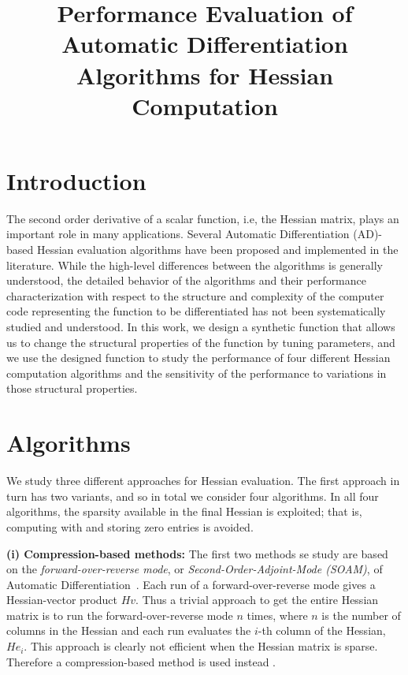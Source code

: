 \documentclass[11pt, twocolumn]{article}
\begin{document}
\title{Performance Evaluation of Automatic Differentiation Algorithms for Hessian Computation}
\maketitle

\section*{Introduction}
The second order derivative of a scalar function, i.e, the Hessian matrix, plays 
an important role in many applications. 
Several Automatic Differentiation (AD)-based Hessian evaluation algorithms have been proposed and implemented in the literature. While the high-level differences between the algorithms is generally understood, the detailed behavior of the algorithms and their performance characterization with respect to the structure and complexity of the computer code  representing the function to be differentiated has not been systematically studied and understood. In this work, we design a synthetic function that allows us to change the structural properties of the function by tuning parameters, and we use the designed function to study the performance of four different Hessian computation algorithms and the sensitivity of the performance to variations in those structural properties.

\section*{Algorithms}

We study three different approaches for Hessian evaluation. The first approach in turn has two variants, and so in total we consider four algorithms. In all four algorithms, 
the sparsity available in the final Hessian is exploited; that is, computing with and storing zero entries is avoided.  

{\bf (i) Compression-based methods:}
The first two methods se study are based on the {\em forward-over-reverse mode}, or {\em Second-Order-Adjoint-Mode (SOAM)}, of Automatic Differentiation~\cite{griewank2008evaluating, naumann2012art}. Each run of a forward-over-reverse mode gives a Hessian-vector product $Hv$. Thus a trivial approach to get the entire Hessian matrix is to run the forward-over-reverse mode $n$ times, where $n$ is the number of columns in the Hessian and each run evaluates the $i$-th column of the Hessian, $He_i$. This approach is clearly not efficient  when the Hessian matrix is sparse.  Therefore a compression-based method is used instead \cite{gebremedhin2009efficient}. 
\end{document}
